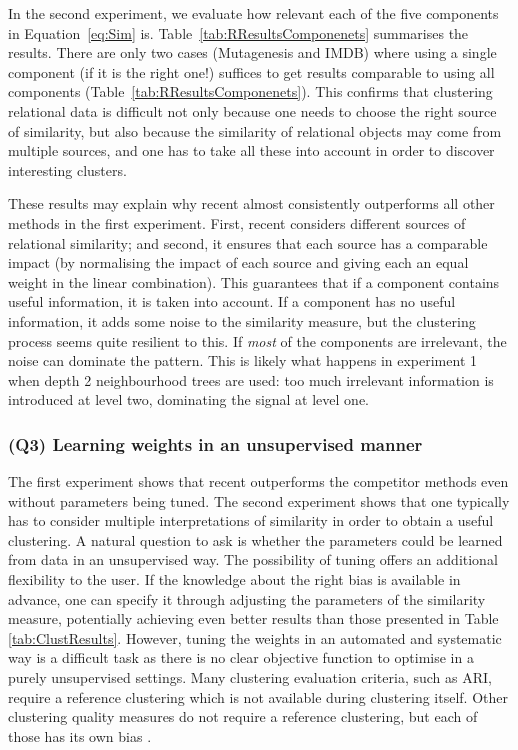 In the second experiment, we evaluate how relevant each of the five components in Equation~\ref{eq:Sim} is.
Table~\ref{tab:RResultsComponenets} summarises the results.
There are only two cases (Mutagenesis and IMDB) where using a single component (if it is the right one!) suffices to get results comparable to using all components (Table~\ref{tab:RResultsComponenets}).
This confirms that clustering relational data is difficult not only because one needs to choose the right source of similarity, but also because the similarity of relational objects may come from multiple sources, and one has to take all these into account in order to discover interesting clusters.




These results may explain why \gls{recent} almost consistently outperforms all other methods in the first experiment.
First, \gls{recent} considers different sources of relational similarity; and second, it ensures that each source has a comparable impact (by normalising the impact of each source and giving each an equal weight in the linear combination).
This guarantees that if a component contains useful information, it is taken into account.
If a component has no useful information, it adds some noise to the similarity measure, but the clustering process seems quite resilient to this.
If {\em most} of the components are irrelevant, the noise can dominate the pattern.
This is likely what happens in experiment 1 when depth 2 neighbourhood trees are used: too much irrelevant information is introduced at level two, dominating the signal at level one.









\subsubsection{\textbf{(Q3) Learning weights in an unsupervised manner}}

The first experiment shows that \gls{recent} outperforms the competitor methods even without parameters being tuned.
The second experiment shows that one typically has to consider multiple interpretations of similarity in order to obtain a useful clustering.
A natural question to ask is whether the  parameters could be learned from data in an unsupervised way.
The possibility of tuning offers an additional flexibility to the user.
If the knowledge about the right bias is available in advance, one can specify it through adjusting the parameters of the similarity measure, potentially achieving even better results than those presented in Table \ref{tab:ClustResults}.
However, tuning the weights in an automated and systematic way is a difficult task as there is no clear objective function to optimise in a purely unsupervised settings.
Many clustering evaluation criteria, such as ARI, require a reference clustering which is not available during clustering itself.  Other clustering quality measures do not require a reference clustering, but each of those has its own bias \cite{VanCraenendonck15}.


